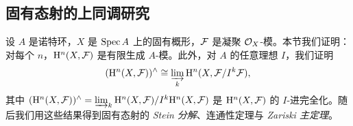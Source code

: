 \subsection{固有态射的上同调研究}
\label{sec:2.5}

设 $A$ 是诺特环，$X$ 是 $\operatorname{Spec} A$ 上的固有概形，$\mathcal{F}$ 是凝聚 $\mathcal{O}_X$-模。本节我们证明：对每个 $n$，$\mathrm{H}^n(X,\mathcal{F})$ 是有限生成 $A$-模。此外，对 $A$ 的任意理想 $I$，我们证明
\[
(\mathrm{H}^n(X,\mathcal{F}))^{\wedge}\cong \varinjlim_k \mathrm{H}^n(X,\mathcal{F}/I^k\mathcal{F}),
\]
其中 $(\mathrm{H}^n(X,\mathcal{F}))^{\wedge}=\varinjlim_k \mathrm{H}^n(X,\mathcal{F})/I^k\mathrm{H}^n(X,\mathcal{F})$ 是 $\mathrm{H}^n(X,\mathcal{F})$ 的 $I$-进完全化。随后我们用这些结果得到固有态射的 \emph{Stein 分解}、连通性定理与 \emph{Zariski 主定理}。

